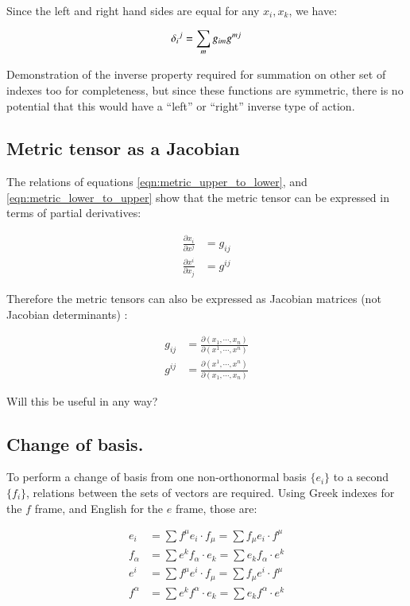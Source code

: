 Since the left and right hand sides are equal for any $x_i, x_k$, we have:

\begin{equation}
{\delta_{i}}^j = \sum_m g_{im} g^{mj} \\
\end{equation}

Demonstration of the inverse property required for summation on other set of indexes too for completeness, but since these functions are symmetric, there 
is no potential that this would have a ``left'' or ``right'' inverse type of action.

\subsection{Metric tensor as a Jacobian }

The relations of equations \ref{eqn:metric_upper_to_lower}, and \ref{eqn:metric_lower_to_upper} show that the metric tensor can be expressed in terms of partial derivatives:

\begin{align}
\frac{\partial x_i }{\partial x^j } &= g_{ij} \\
\frac{\partial x^i }{\partial x_j } &= g^{ij}
\end{align}

Therefore the metric tensors can also be expressed as Jacobian matrices (not Jacobian determinants) :

\begin{align}
g_{ij} &= \frac{\partial (x_1, \cdots, x_n) }{\partial (x^1, \cdots, x^n) } \\
g^{ij} &= \frac{\partial (x^1, \cdots, x^n) }{\partial (x_1, \cdots, x_n) }
\end{align}

Will this be useful in any way?

\subsection{Change of basis. }

To perform a change of basis from one non-orthonormal basis $\{e_i\}$ to a second $\{f_i\}$, relations between the sets of vectors
are required.  Using Greek indexes for the $f$ frame, and English for the $e$ frame, those are:

\begin{align*}
e_i 		&= \sum f^{\mu} e_i \cdot f_{\mu} 	= \sum f_{\mu} e_i \cdot f^{\mu} \\
f_{\alpha} 	&= \sum e^k f_{\alpha} \cdot e_k 	= \sum e_k f_{\alpha} \cdot e^k \\
e^i 		&= \sum f^{\mu} e^i \cdot f_{\mu} 	= \sum f_{\mu} e^i \cdot f^{\mu} \\
f^{\alpha} 	&= \sum e^k f^{\alpha} \cdot e_k 	= \sum e_k f^{\alpha} \cdot e^k 
\end{align*}

